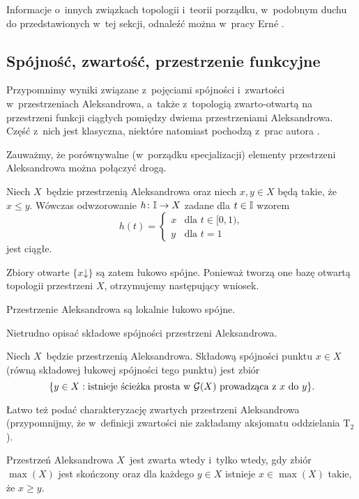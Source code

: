 Informacje o~innych związkach topologii i~teorii porządku, w~podobnym duchu do przedstawionych w~tej sekcji, odnaleźć można w~pracy Ern{\'e} \cite{Erne90}.




\subsection{Spójność, zwartość, przestrzenie funkcyjne}
Przypomnimy wyniki związane z~pojęciami spójności i~zwartości w~przestrzeniach Aleksandrowa, a~także z~topologią zwarto-otwartą na przestrzeni funkcji ciągłych pomiędzy dwiema przestrzeniami Aleksandrowa. Część z~nich jest klasyczna, niektóre natomiast pochodzą z~prac autora \cite{Kukiela10a,Kukiela10}.

Zauważmy, że porównywalne (w~porządku specjalizacji) elementy przestrzeni Aleksandrowa można połączyć drogą.
\begin{stw}\label{stw-droga_miedzy_porownywalnymi}
Niech $X$~będzie przestrzenią Aleksandrowa oraz niech $x,y\in X$ będą takie, że $x\leq y$. Wówczas odwzorowanie $h\colon \mathbb{I}\to X$ zadane dla $t\in \mathbb{I}$ wzorem \[h(t)=\begin{cases}x & \text{dla } t\in [0,1),\\ y & \text{dla } t=1\end{cases}\] jest ciągłe.
\end{stw}
Zbiory otwarte $\{x\mathord{\downarrow}\}$ są zatem łukowo spójne. Ponieważ tworzą one bazę otwartą topologii przestrzeni $X$, otrzymujemy następujący wniosek.
\begin{wn}
Przestrzenie Aleksandrowa są lokalnie łukowo spójne.
\end{wn}
Nietrudno opisać składowe spójności przestrzeni Aleksandrowa.
\begin{wn}\label{wn-stonga_o_skl_spojnosci}
Niech $X$~będzie przestrzenią Aleksandrowa. Składową spójności punktu $x\in X$ (równą składowej łukowej spójności tego punktu) jest zbiór \[\{y\in X: \text{istnieje ścieżka prosta w } \mathcal{G}(X) \text{ prowadząca z } x \text{ do } y\}.\]
\end{wn}
Łatwo też podać charakteryzację zwartych przestrzeni Aleksandrowa (przypomnijmy, że w~definicji zwartości nie zakładamy aksjomatu oddzielania $\mathrm{T_2}$). 
\begin{stw}
Przestrzeń Aleksandrowa $X$~jest zwarta wtedy i~tylko wtedy, gdy zbiór $\max(X)$ jest skończony oraz dla każdego $y\in X$ istnieje $x\in\max(X)$ takie, że $x\geqslant y$.
\end{stw}

